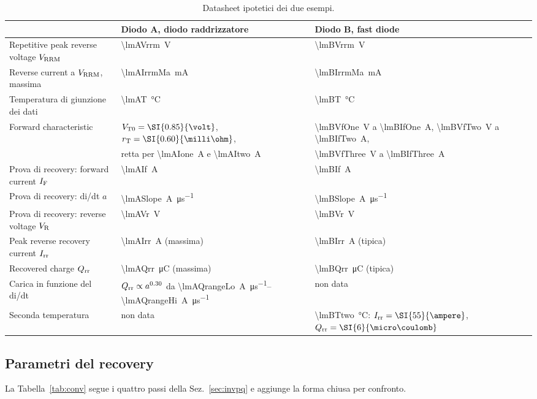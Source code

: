 \documentclass[10pt,a4paper]{scrartcl}
\let\newcommand\lmitdefine
\newcommand{\IF}{I_\mathrm{F}}
\newcommand{\VR}{V_\mathrm{R}}
\newcommand{\Irr}{I_\mathrm{rr}}
\newcommand{\Qrr}{Q_\mathrm{rr}}
\newcommand{\VTo}{V_\mathrm{T0}}
\newcommand{\rT}{r_\mathrm{T}}
\newcommand{\Vrrm}{V_\mathrm{RRM}}
\begin{document}
\begin{table}[htb]
\centering\small
\caption{Datasheet ipotetici dei due esempi.}
\label{tab:data}
\begin{tabular}{@{}lll@{}}
\toprule
 & Diodo A, diodo raddrizzatore & Diodo B, fast diode \\
\midrule
Repetitive peak reverse voltage $\Vrrm$ & \SI{\lmAVrrm}{\volt} & \SI{\lmBVrrm}{\volt} \\
Reverse current a $\Vrrm$, massima & \SI{\lmAIrrmMa}{\milli\ampere} & \SI{\lmBIrrmMa}{\milli\ampere} \\
Temperatura di giunzione dei dati & \SI{\lmAT}{\celsius} & \SI{\lmBT}{\celsius} \\
Forward characteristic & $\VTo = \SI{\lmAVto}{\volt}$, $\rT = \SI{\lmARt}{\milli\ohm}$, & \SI{\lmBVfOne}{\volt} a \SI{\lmBIfOne}{\ampere}, \SI{\lmBVfTwo}{\volt} a \SI{\lmBIfTwo}{\ampere}, \\
 & retta per \SI{\lmAIone}{\ampere} e \SI{\lmAItwo}{\ampere} & \SI{\lmBVfThree}{\volt} a \SI{\lmBIfThree}{\ampere} \\
Prova di recovery: forward current $\IF$ & \SI{\lmAIf}{\ampere} & \SI{\lmBIf}{\ampere} \\
Prova di recovery: di/dt $a$ & \SI{\lmASlope}{\ampere\per\micro\second} & \SI{\lmBSlope}{\ampere\per\micro\second} \\
Prova di recovery: reverse voltage $\VR$ & \SI{\lmAVr}{\volt} & \SI{\lmBVr}{\volt} \\
Peak reverse recovery current $\Irr$ & \SI{\lmAIrr}{\ampere} (massima) & \SI{\lmBIrr}{\ampere} (tipica) \\
Recovered charge $\Qrr$ & \SI{\lmAQrr}{\micro\coulomb} (massima) & \SI{\lmBQrr}{\micro\coulomb} (tipica) \\
Carica in funzione del di/dt & $\Qrr \propto a^{\lmAQexp}$ da \SIrange{\lmAQrangeLo}{\lmAQrangeHi}{\ampere\per\micro\second} & non data \\
Seconda temperatura & non data & \SI{\lmBTtwo}{\celsius}: $\Irr = \SI{\lmBIrrTtwo}{\ampere}$, $\Qrr = \SI{\lmBQrrTtwo}{\micro\coulomb}$ \\
\bottomrule
\end{tabular}
\end{table}

\subsection{Parametri del recovery}
\label{sec:exrec}
La Tabella~\ref{tab:conv} segue i quattro passi della Sez.~\ref{sec:invpq} e aggiunge la forma chiusa per confronto.
\end{document}
